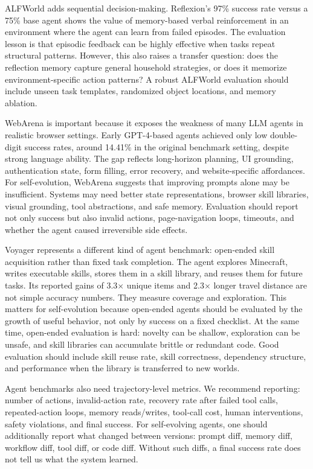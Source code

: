 ALFWorld adds sequential decision-making. Reflexion's 97\% success rate versus a 75\% base agent shows the value of memory-based verbal reinforcement in an environment where the agent can learn from failed episodes. The evaluation lesson is that episodic feedback can be highly effective when tasks repeat structural patterns. However, this also raises a transfer question: does the reflection memory capture general household strategies, or does it memorize environment-specific action patterns? A robust ALFWorld evaluation should include unseen task templates, randomized object locations, and memory ablation.

WebArena is important because it exposes the weakness of many LLM agents in realistic browser settings. Early GPT-4-based agents achieved only low double-digit success rates, around 14.41\% in the original benchmark setting, despite strong language ability. The gap reflects long-horizon planning, UI grounding, authentication state, form filling, error recovery, and website-specific affordances. For self-evolution, WebArena suggests that improving prompts alone may be insufficient. Systems may need better state representations, browser skill libraries, visual grounding, tool abstractions, and safe memory. Evaluation should report not only success but also invalid actions, page-navigation loops, timeouts, and whether the agent caused irreversible side effects.

Voyager represents a different kind of agent benchmark: open-ended skill acquisition rather than fixed task completion. The agent explores Minecraft, writes executable skills, stores them in a skill library, and reuses them for future tasks. Its reported gains of 3.3$\times$ unique items and 2.3$\times$ longer travel distance are not simple accuracy numbers. They measure coverage and exploration. This matters for self-evolution because open-ended agents should be evaluated by the growth of useful behavior, not only by success on a fixed checklist. At the same time, open-ended evaluation is hard: novelty can be shallow, exploration can be unsafe, and skill libraries can accumulate brittle or redundant code. Good evaluation should include skill reuse rate, skill correctness, dependency structure, and performance when the library is transferred to new worlds.

Agent benchmarks also need trajectory-level metrics. We recommend reporting: number of actions, invalid-action rate, recovery rate after failed tool calls, repeated-action loops, memory reads/writes, tool-call cost, human interventions, safety violations, and final success. For self-evolving agents, one should additionally report what changed between versions: prompt diff, memory diff, workflow diff, tool diff, or code diff. Without such diffs, a final success rate does not tell us what the system learned.

